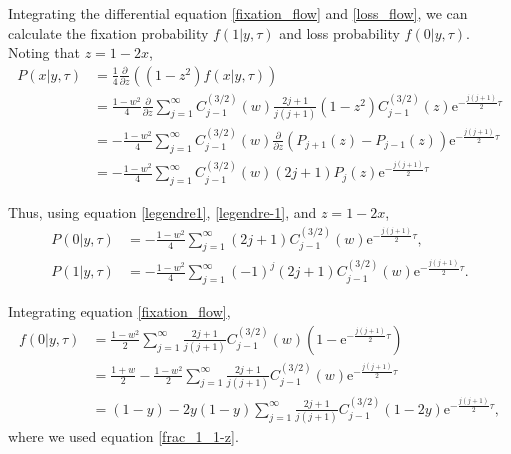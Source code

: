 \documentclass[12pt]{article}
\newcommand{\napier}{\mathrm{e}}
\newcommand{\henbibun}[2]{\frac{\partial {#1}}{\partial {#2}}}
\begin{document}
Integrating the differential equation \eqref{fixation_flow} and \eqref{loss_flow}, we can calculate the fixation probability $f(1|y,\tau)$ and loss probability $f(0|y,\tau)$.
Noting that $z = 1-2x$,
\begin{align}
 P(x|y, \tau) & = \frac{1}{4} \henbibun{}{z} \left( (1-z^2) f(x|y,\tau)\right)\\
 & = \frac{1-w^2}{4} \henbibun{}{z} \sum_{j=1}^{\infty} C^{(3/2)}_{j-1} (w) \frac{2j+1}{j(j+1)} (1-z^2) C^{(3/2)}_{j-1} (z) \napier^{-\frac{j(j+1)}{2}\tau}\\
 & = - \frac{1-w^2}{4} \sum_{j=1}^{\infty} C^{(3/2)}_{j-1} (w) \henbibun{}{z} \left( P_{j+1}(z) - P_{j-1}(z) \right) \napier^{-\frac{j(j+1)}{2}\tau}\\
 & = - \frac{1-w^2}{4} \sum_{j=1}^{\infty} C^{(3/2)}_{j-1} (w) (2j+1)P_{j}(z) \napier^{-\frac{j(j+1)}{2}\tau}
\end{align}

Thus, using equation \eqref{legendre1}, \eqref{legendre-1}, and $z=1-2x$,
\begin{align}
 P(0|y, \tau) & = - \frac{1-w^2}{4} \sum_{j=1}^{\infty} (2j+1) C^{(3/2)}_{j-1} (w) \napier^{-\frac{j(j+1)}{2}\tau},\\
 P(1|y, \tau) & = - \frac{1-w^2}{4} \sum_{j=1}^{\infty} (-1)^j (2j+1) C^{(3/2)}_{j-1} (w) \napier^{-\frac{j(j+1)}{2}\tau}.
\end{align}

Integrating equation \eqref{fixation_flow},
\begin{align}
 f(0|y,\tau) & = \frac{1-w^2}{2} \sum_{j=1}^{\infty} \frac{2j+1}{j(j+1)} C^{(3/2)}_{j-1} (w) \left(1 - \napier^{-\frac{j(j+1)}{2}\tau} \right)\\
 & = \frac{1+w}{2} - \frac{1-w^2}{2} \sum_{j=1}^{\infty} \frac{2j+1}{j(j+1)} C^{(3/2)}_{j-1} (w) \napier^{-\frac{j(j+1)}{2}\tau}\\
 & = (1-y) - 2y(1-y) \sum_{j=1}^{\infty} \frac{2j+1}{j(j+1)} C^{(3/2)}_{j-1} (1-2y) \napier^{-\frac{j(j+1)}{2}\tau},
\end{align}
where we used equation \eqref{frac_1_1-z}.
\end{document}
